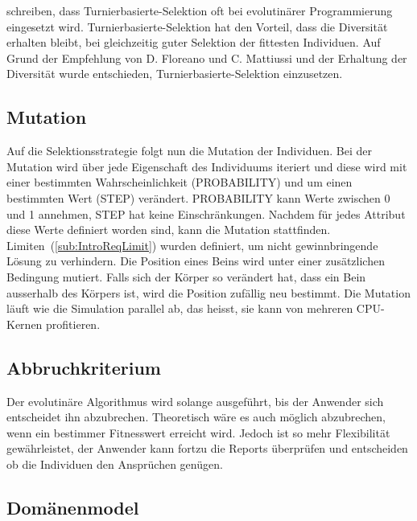       \citet[S.33]{book:bioInspired} schreiben, dass Turnierbasierte-Selektion oft bei evolutinärer Programmierung eingesetzt wird.
      Turnierbasierte-Selektion hat den Vorteil, dass die Diversität erhalten bleibt,
      bei gleichzeitig guter Selektion der fittesten Individuen.
      Auf Grund der Empfehlung von D. Floreano und C. Mattiussi und der Erhaltung der Diversität wurde entschieden, Turnierbasierte-Selektion einzusetzen.

    \subsection{Mutation\label{sec:Mutation}}

      Auf die Selektionsstrategie folgt nun die Mutation der Individuen.
      Bei der Mutation wird über jede Eigenschaft des Individuums iteriert und
      diese wird mit einer bestimmten Wahrscheinlichkeit (PROBABILITY) und um einen bestimmten Wert (STEP) verändert.
      PROBABILITY kann Werte zwischen 0 und 1 annehmen, STEP hat keine Einschränkungen.
      Nachdem für jedes Attribut diese Werte definiert worden sind, kann die Mutation stattfinden.
      Limiten~(\vref{sub:IntroReqLimit}) wurden definiert, um nicht gewinnbringende Lösung zu verhindern.
      Die Position eines Beins wird unter einer zusätzlichen Bedingung mutiert. Falls sich der Körper so verändert hat,
      dass ein Bein ausserhalb des Körpers ist, wird die Position zufällig neu bestimmt.
      Die Mutation läuft wie die Simulation parallel ab, das heisst, sie kann von mehreren CPU-Kernen profitieren.

    \subsection{Abbruchkriterium}

      Der evolutinäre Algorithmus wird solange ausgeführt, bis der Anwender sich entscheidet ihn abzubrechen.
      Theoretisch wäre es auch möglich abzubrechen, wenn ein bestimmer Fitnesswert erreicht wird.
      Jedoch ist so mehr Flexibilität gewährleistet, der Anwender kann fortzu die Reports überprüfen und entscheiden
      ob die Individuen den Ansprüchen genügen.

    \subsection{Domänenmodel\label{sub:domMod}}


